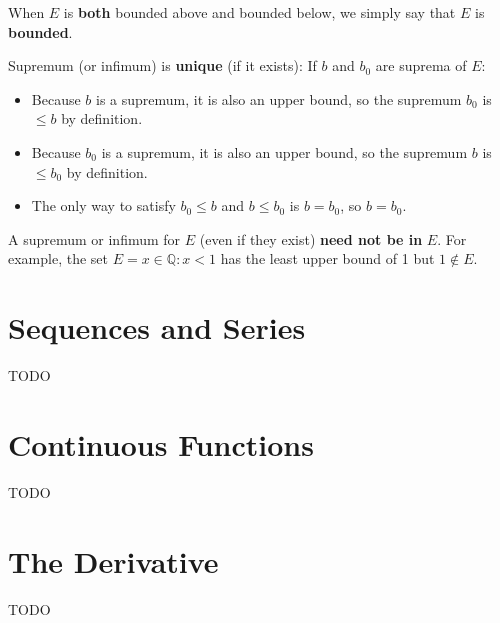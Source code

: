 \documentclass[12pt, letterpaper, oneside]{book}
\begin{document}
When $E$ is \textbf{both} bounded above and bounded below, we simply say that $E$ is \textbf{bounded}.

Supremum (or infimum) is \textbf{unique} (if it exists): If $b$ and $b_0$ are suprema of $E$:
\begin{itemize}
  \item Because $b$ is a supremum, it is also an upper bound, so the supremum $b_0$ is $\le b$ by definition.
  \item Because $b_0$ is a supremum, it is also an upper bound, so the supremum $b$ is $\le b_0$ by definition.
  \item The only way to satisfy $b_0 \le b$ and $b \le b_0$ is $b = b_0$, so $b = b_0$.
\end{itemize}

A supremum or infimum for $E$ (even if they exist) \textbf{need not be in} $E$. For example, the set $E = {x \in
  \mathbb{Q}: x < 1}$ has the least upper bound of 1 but $1 \notin E$.

%
%

\chapter{Sequences and Series}

TODO

%
%

\chapter{Continuous Functions}

TODO

%
%

\chapter{The Derivative}

TODO

%
%
\end{document}

